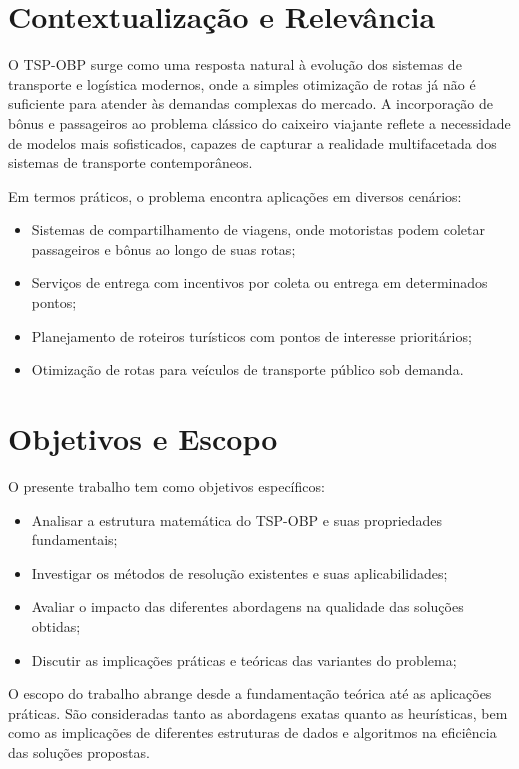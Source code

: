 \documentclass[12pt, a4paper]{report}
\begin{document}
\section{Contextualização e Relevância}

O TSP-OBP surge como uma resposta natural à evolução dos sistemas de transporte e logística modernos, onde a simples otimização de rotas já não é suficiente para atender às demandas complexas do mercado. A incorporação de bônus e passageiros ao problema clássico do caixeiro viajante reflete a necessidade de modelos mais sofisticados, capazes de capturar a realidade multifacetada dos sistemas de transporte contemporâneos.

Em termos práticos, o problema encontra aplicações em diversos cenários:
\begin{itemize}
    \item Sistemas de compartilhamento de viagens, onde motoristas podem coletar passageiros e bônus ao longo de suas rotas;
    \item Serviços de entrega com incentivos por coleta ou entrega em determinados pontos;
    \item Planejamento de roteiros turísticos com pontos de interesse prioritários;
    \item Otimização de rotas para veículos de transporte público sob demanda.
\end{itemize}

\section{Objetivos e Escopo}
O presente trabalho tem como objetivos específicos:
\begin{itemize}
    \item Analisar a estrutura matemática do TSP-OBP e suas propriedades fundamentais;
    \item Investigar os métodos de resolução existentes e suas aplicabilidades;
    \item Avaliar o impacto das diferentes abordagens na qualidade das soluções obtidas;
    \item Discutir as implicações práticas e teóricas das variantes do problema;
\end{itemize}

O escopo do trabalho abrange desde a fundamentação teórica até as aplicações práticas. São consideradas tanto as abordagens exatas quanto as heurísticas, bem como as implicações de diferentes estruturas de dados e algoritmos na eficiência das soluções propostas.
\end{document}
